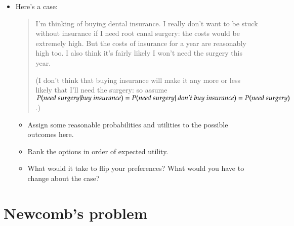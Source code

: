 \documentclass[justified]{tufte-handout}
\begin{document}
\begin{itemize}

\item Here's a case: 

\begin{quote}

I'm thinking of buying dental insurance. I really don't want to be stuck without insurance if I need root canal surgery: the costs would be extremely high. But the costs of insurance for a year are reasonably high too. I also think it's fairly likely I won't need the surgery this year.

(I don't think that buying insurance will make it any more or less likely that I'll need the surgery: so assume $P(\emph{need surgery}|\emph{buy insurance})= P(\emph{need surgery}|\emph{ don't buy insurance}) = P(\emph{need surgery})$.)

\end{quote}


\begin{itemize}

\item Assign some reasonable probabilities and utilities to the possible outcomes here.


\item Rank the options in order of expected utility.

\item What would it take to flip your preferences? What would you have to change about the case?

\end{itemize}

\end{itemize}


\section{Newcomb's problem}
\end{document}
